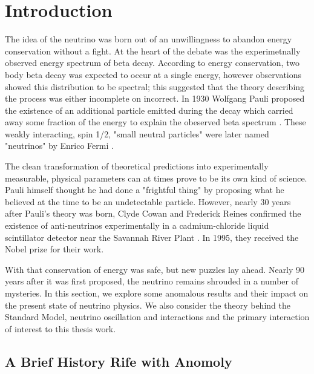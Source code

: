 \documentclass[12pt]{article}
\begin{document}
\section{Introduction}
The idea of the neutrino was born out of an unwillingness to abandon energy conservation without a fight. At the heart of the debate was the experimetnally observed energy spectrum of beta decay. According to energy conservation, two body beta decay was expected to occur at a single energy, however observations showed this distribution to be spectral; this suggested that the theory describing the process was either incomplete on incorrect.  In 1930 Wolfgang Pauli proposed the existence of an additional particle emitted during the decay which carried away some fraction of the energy to explain the obeserved beta spectrum \cite{bib:pauli}. These weakly interacting, spin 1/2, "small neutral particles" were later named "neutrinos" by Enrico Fermi \cite{bib:fermi}. 
\par The clean transformation of theoretical predictions into experimentally measurable, physical parameters can at times prove to be its own kind of science. Pauli himself thought he had done a "frightful thing" by proposing what he believed at the time to be an undetectable particle. However, nearly 30 years after Pauli's theory was born, Clyde Cowan and Frederick Reines confirmed the existence of anti-neutrinos experimentally in a cadmium-chloride liquid scintillator detector near the Savannah River Plant \cite{bib:cowan}. In 1995, they received the Nobel prize for their work.
\par With that conservation of energy was safe, but new puzzles lay ahead. Nearly 90 years after it was first proposed, the neutrino remains shrouded in a number of mysteries. In this section, we explore some anomalous results and their impact on the present state of neutrino physics.  We also consider the theory behind the Standard Model, neutrino oscillation and interactions and the primary interaction of interest to this thesis work. 

\subsection{A Brief History Rife with Anomoly}
\end{document}

